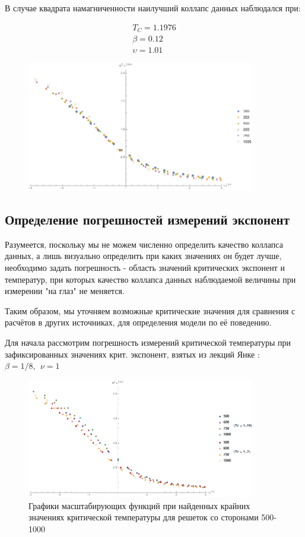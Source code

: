 В случае квадрата намагниченности наилучший коллапс данных наблюдался при:

\begin{align*}
    T_{C} = 1.1976 \\
    \beta = 0.12 \\
    \upsilon = 1.01
\end{align*}

\begin{figure}[!h]
    \centering
    \includegraphics[width=100mm]{Sections/Images/DatColMagn2_3.png}
    \label{fig:DatColM2_3}
\end{figure}

\subsection{Определение погрешностей измерений экспонент}

Разумеется, поскольку мы не можем численно определить качество коллапса данных, а лишь визуально определить при каких значениях он будет лучше, необходимо задать погрешность - область значений критических экспонент и температур, при которых качество коллапса данных наблюдаемой величины при измерении "на глаз" не меняется.

Таким образом, мы уточняем возможные критические значения для сравнения с расчётов в других источниках, для определения модели по её поведению.

Для начала рассмотрим погрешность измерений критической температуры при зафиксированных значениях крит. экспонент, взятых из лекций Янке \cite{Yanke}:
$\beta = 1/8,\ \ \nu = 1$

\begin{figure}[!h]
    \centering
    \includegraphics[width=100mm]{Sections/Images/ErrTc2_2.png}
    \caption{Графики масштабирующих функций при найденных крайних значениях критической температуры для решеток со сторонами 500-1000}
    \label{fig:ErrTc2_2}
\end{figure}

